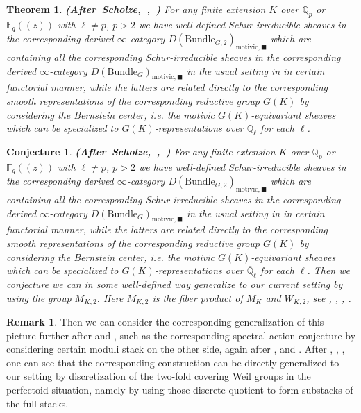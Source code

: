 \documentclass[12pt]{book}
\newtheorem{conjecture}{Conjecture}
\newtheorem{theorem}{Theorem}
\theoremstyle{definition}
\newtheorem{remark}{Remark}
\begin{document}
\begin{theorem} \mbox{\textbf{(After Scholze, \cite{Scho1}, \cite{Scho2})}}
For any finite extension $K$ over $\mathbb{Q}_p$ or $\mathbb{F}_q((z))$ with $\ell\neq p$, $p>2$ we have well-defined Schur-irreducible sheaves in the corresponding derived $\infty$-category $D(\mathrm{Bundle}_{G,2})_{\text{motivic},\blacksquare}$ which are containing all the corresponding Schur-irreducible sheaves in the corresponding derived $\infty$-category $D(\mathrm{Bundle}_{G})_{\text{motivic},\blacksquare}$ in the usual setting in \cite{Scho1} in certain functorial manner, while the latters are related directly to the corresponding smooth representations of the corresponding reductive group $G(K)$ by considering the Bernstein center, i.e. the motivic $G(K)$-equivariant sheaves which can be specialized to $G(K)$-representations over $\overline{\mathbb{Q}}_\ell$ for each $\ell$. 
\end{theorem}


\begin{conjecture} \mbox{\textbf{(After Scholze, \cite{Scho1}, \cite{Scho2})}}
For any finite extension $K$ over $\mathbb{Q}_p$ or $\mathbb{F}_q((z))$ with $\ell\neq p$, $p>2$ we have well-defined Schur-irreducible sheaves in the corresponding derived $\infty$-category $D(\mathrm{Bundle}_{G,2})_{\text{motivic},\blacksquare}$ which are containing all the corresponding Schur-irreducible sheaves in the corresponding derived $\infty$-category $D(\mathrm{Bundle}_{G})_{\text{motivic},\blacksquare}$ in the usual setting in \cite{Scho1} in certain functorial manner, while the latters are related directly to the corresponding smooth representations of the corresponding reductive group $G(K)$ by considering the Bernstein center, i.e. the motivic $G(K)$-equivariant sheaves which can be specialized to $G(K)$-representations over $\overline{\mathbb{Q}}_\ell$ for each $\ell$. Then we conjecture we can in some well-defined way generalize \cite{Scho1} to our current setting by using the group $M_{K,2}$. Here $M_{K,2}$ is the fiber product of $M_{K}$ and $W_{K,2}$, see \cite{Scho1}, \cite{A2}, \cite{A3}, \cite{A4}. 
\end{conjecture}




\begin{remark}
Then we can consider the corresponding generalization of this picture further after \cite{FS} and \cite{Scho1}, such as the corresponding spectral action conjecture by considering certain moduli stack on the other side, again after \cite{AI}, \cite{KI} and \cite{KXII}. After \cite{DHKM}, \cite{FS}, \cite{Z}, one can see that the corresponding construction can be directly generalized to our setting by discretization of the two-fold covering Weil groups in the perfectoid situation, namely by using those discrete quotient to form substacks of the full stacks. 
\end{remark}
\end{document}

